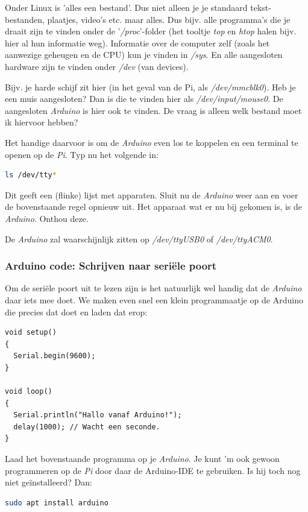Onder Linux is 'alles een bestand'. Dus niet alleen je je standaard tekst-bestanden, plaatjes, video's etc. maar alles. Dus bijv. alle programma's die je draait zijn te vinden onder de '\textit{/proc}'-folder (het tooltje \textit{top} en \textit{htop} halen bijv. hier al hun informatie weg). Informatie over de computer zelf (zoals het aanwezige geheugen en de CPU) kun je vinden in \textit{/sys}. En alle aangesloten hardware zijn te vinden onder \textit{/dev} (van devices). 

Bijv. je harde schijf zit hier (in het geval van de Pi, als \textit{/dev/mmcblk0}). Heb je een muis aangesloten? Dan is die te vinden hier als \textit{/dev/input/mouse0}. De aangesloten \textit{Arduino} is hier ook te vinden. De vraag is alleen welk bestand moet ik hiervoor hebben? \newline

Het handige daarvoor is om de \textit{Arduino} even los te koppelen en een terminal te openen op de \textit{Pi}. Typ nu het volgende in:
\begin{lstlisting}[language=bash]
ls /dev/tty*
\end{lstlisting}
Dit geeft een (flinke) lijst met apparaten. Sluit nu de \textit{Arduino} weer aan en voer de bovenstaande regel opnieuw uit. Het apparaat wat er nu bij gekomen is, is de \textit{Arduino}. Onthou deze.

\begin{remark}
  De \textit{Arduino} zal waarschijnlijk zitten op \textit{/dev/ttyUSB0} of \textit{/dev/ttyACM0}.
\end{remark}

\newpage 

\subsubsection{Arduino code: Schrijven naar seriële poort}
Om de seriële poort uit te lezen zijn is het natuurlijk wel handig dat de \textit{Arduino} daar iets mee doet. We maken even snel een klein programmaatje op de Arduino die precies dat doet en laden dat erop:
\begin{lstlisting}[language=Arduino, basicstyle=\ttfamily\footnotesize]
void setup() 
{
  Serial.begin(9600);
}

void loop() 
{
  Serial.println("Hallo vanaf Arduino!");
  delay(1000); // Wacht een seconde.
}
\end{lstlisting}
\begin{exercise}
  Laad het bovenstaande programma op je \textit{Arduino}. Je kunt 'm ook gewoon programmeren op de \textit{Pi} door daar de Arduino-IDE te gebruiken. Is hij toch nog niet geïnstalleerd? Dan:
  \begin{lstlisting}[language=bash]
  sudo apt install arduino
  \end{lstlisting}
\end{exercise}

